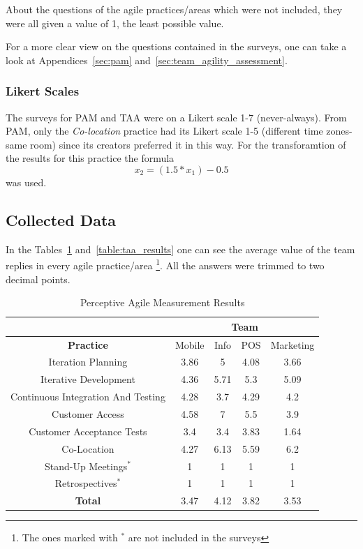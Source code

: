 About the questions of the agile practices/areas which were not included, they were all given a value of 1, the least possible value. 

For a more clear view on the questions contained in the surveys, one can take a look at Appendices~\ref{sec:pam} and~\ref{sec:team_agility_assessment}.

\subsubsection{Likert Scales}
The surveys for PAM and TAA were on a Likert scale 1-7 (never-always). From PAM,  only the \textit{Co-location} practice had its Likert scale 1-5 (different time zones-same room) since its creators preferred it in this way. For the transforamtion of the results for this practice the formula \cite{likert_transformation} \begin{equation} x_2 = (1.5 * x_1) - 0.5 \end{equation} was used. 


\subsection{Collected Data}

In the Tables~\ref{table:pam_results} and~\ref{table:taa_results} one can see the average value of the team replies in every agile practice/area \footnote{The ones  marked with $^\ast$ are not included in the surveys}. All the answers were trimmed to two decimal points.

\begin{table} [H]
\caption{Perceptive Agile Measurement Results}
\label{table:pam_results}
\begin{tabular}{| c | c | c | c | c |}
\hline
  & \multicolumn{4}{c|}{\textbf{Team}} \\ \hline
\textbf{Practice} & Mobile & Info & POS & Marketing \\ \hline
Iteration Planning & 3.86 & 5 & 4.08 & 3.66 \\ \hline
Iterative Development & 4.36 & 5.71 & 5.3 & 5.09 \\ \hline
Continuous Integration And Testing & 4.28 & 3.7 & 4.29 & 4.2 \\ \hline
Customer Access & 4.58 & 7 & 5.5 & 3.9 \\ \hline
Customer Acceptance Tests & 3.4 & 3.4 & 3.83 & 1.64 \\ \hline
Co-Location & 4.27 & 6.13 & 5.59 & 6.2 \\ \hline 
Stand-Up Meetings$^\ast$ & 1 & 1 & 1 & 1 \\ \hline
Retrospectives$^\ast$ & 1 & 1 & 1 & 1 \\ \hline
\textbf{Total} & 3.47 & 4.12 & 3.82 & 3.53 \\ \hline
\end{tabular}
\end{table}

